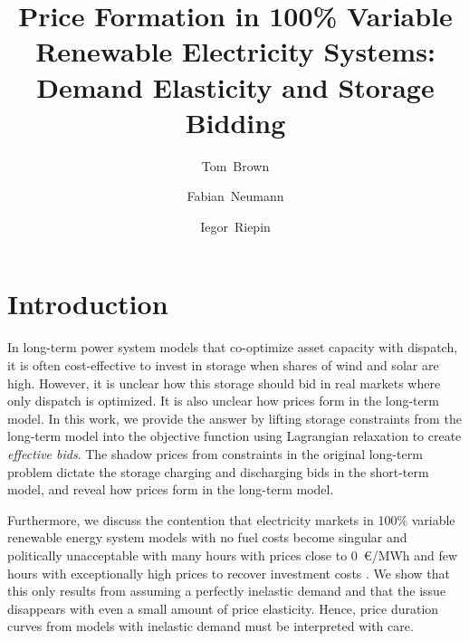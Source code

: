 \documentclass[final,3p]{elsarticle}
\begin{document}
\begin{frontmatter}

	\title{Price Formation in 100\% Variable Renewable Electricity Systems:\\Demand Elasticity and Storage Bidding}

	\author[tub]{Tom~Brown}
	\author[tub]{Fabian~Neumann}
	\author[tub]{Iegor~Riepin}

	\address[tub]{Department of Digital Transformation in Energy Systems, Institute of Energy Technology, Technische Universität Berlin (TUB), Einsteinufer 25 (TA 8), 10587, Berlin, Germany}


  \end{frontmatter}

\section*{Introduction}

In long-term power system models that co-optimize asset capacity with dispatch,
it is often cost-effective to invest in storage when shares of wind and solar
are high. However, it is unclear how this storage should bid in real markets
where only dispatch is optimized. It is also unclear how prices form in the
long-term model. In this work, we provide the answer by lifting storage
constraints from the long-term model into the objective function using
Lagrangian relaxation to create \textit{effective bids}. The shadow prices from
constraints in the original long-term problem dictate the storage charging and
discharging bids in the short-term model, and reveal how prices form in the
long-term model.

Furthermore, we discuss the contention that electricity markets in 100\%
variable renewable energy system models with no fuel costs become singular and
politically unacceptable with many hours with prices close to 0~\euro/MWh and
few hours with exceptionally high prices to recover investment costs
\cite{jungePropertiesDeeply2022,levinEnergyStorage2023,taylorPowerSystems2015}. We show that this only results from assuming a
perfectly inelastic demand and that the issue disappears with even a small
amount of price elasticity. Hence, price duration curves from models with
inelastic demand must be interpreted with care.
\end{document}

